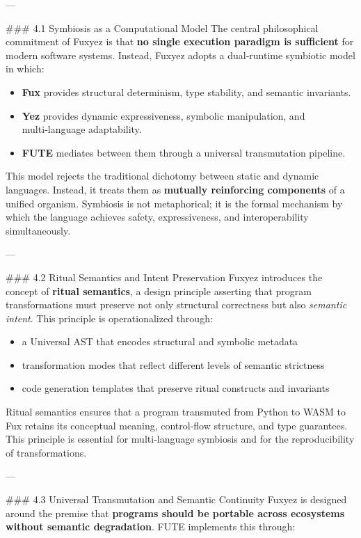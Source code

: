 ---

\#\#\# 4.1 Symbiosis as a Computational Model  
The central philosophical commitment of Fuxyez is that \textbf{no single execution paradigm is sufficient} for modern software systems. Instead, Fuxyez adopts a dual‑runtime symbiotic model in which:

\begin{itemize}
  \item \textbf{Fux} provides structural determinism, type stability, and semantic invariants.  
  \item \textbf{Yez} provides dynamic expressiveness, symbolic manipulation, and multi‑language adaptability.  
  \item \textbf{FUTE} mediates between them through a universal transmutation pipeline.
\end{itemize}

This model rejects the traditional dichotomy between static and dynamic languages. Instead, it treats them as \textbf{mutually reinforcing components} of a unified organism. Symbiosis is not metaphorical; it is the formal mechanism by which the language achieves safety, expressiveness, and interoperability simultaneously.

---

\#\#\# 4.2 Ritual Semantics and Intent Preservation  
Fuxyez introduces the concept of \textbf{ritual semantics}, a design principle asserting that program transformations must preserve not only structural correctness but also \textit{semantic intent}. This principle is operationalized through:

\begin{itemize}
  \item a Universal AST that encodes structural and symbolic metadata  
  \item transformation modes that reflect different levels of semantic strictness  
  \item code generation templates that preserve ritual constructs and invariants  
\end{itemize}

Ritual semantics ensures that a program transmuted from Python to WASM to Fux retains its conceptual meaning, control‑flow structure, and type guarantees. This principle is essential for multi‑language symbiosis and for the reproducibility of transformations.

---

\#\#\# 4.3 Universal Transmutation and Semantic Continuity  
Fuxyez is designed around the premise that \textbf{programs should be portable across ecosystems without semantic degradation}. FUTE implements this through:

